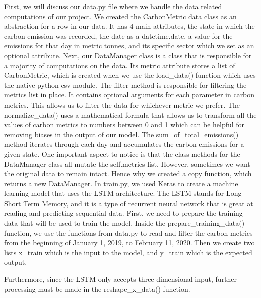 \documentclass[fontsize=11pt]{article}
\begin{document}
First, we will discuss our data.py file where we handle the data related computations of our project. We created the CarbonMetric data class as an abstraction for a row in our data. It has 4 main attributes, the state in which the carbon emission was recorded, the date as a datetime.date, a value for the emissions for that day in metric tonnes, and its specific sector which we set as an optional attribute. Next, our DataManager class is a class that is responsible for a majority of computations on the data. Its metric attribute stores a list of CarbonMetric, which is created when we use the load\_data() function which uses the native python csv module. The filter method is responsible for filtering the metrics list in place. It contains optional arguments for each parameter in carbon metrics. This allows us to filter the data for whichever metric we prefer. The normalize\_data() uses a mathematical formula that allows us to transform all the values of carbon metrics to numbers between 0 and 1 which can be helpful for removing biases in the output of our model. The sum\_of\_total\_emissions() method iterates through each day and accumulates the carbon emissions for a given state. One important aspect to notice is that the class methods for the DataManager class all mutate the self.metrics list. However, sometimes we want the original data to remain intact. Hence why we created a copy function, which returns a new DataManager.
In train.py, we used Keras to create a machine learning model that uses the LSTM architecture. The LSTM stands for Long Short Term Memory, and it is a type of recurrent neural network that is great at reading and predicting sequential data. First, we need to prepare the training data that will be used to train the model. Inside the prepare\_training\_data() function, we use the functions from data.py to read and filter the carbon metrics from the beginning of January 1, 2019, to February 11, 2020. Then we create two lists x\_train which is the input to the model, and y\_train which is the expected output.

\begin{center}
\vspace*{-2.25cm}

\vspace*{-4.75cm}
\end{center}

Furthermore, since the LSTM only accepts three dimensional input, further processing must be made in the reshape\_x\_data() function.

\begin{center}
\vspace*{-2.25cm}

\vspace*{-3.25cm}
\end{center}
\end{document}
